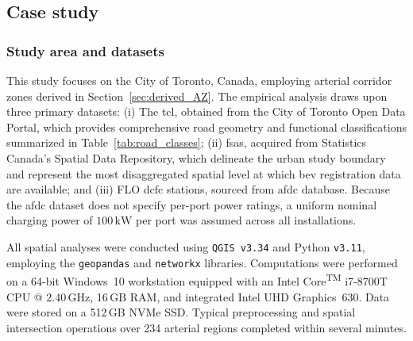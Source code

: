  

\subsection{Case study}
\label{sec:case_study}
\subsubsection{Study area and datasets}
\label{subsec:study_area}
This study focuses on the City of Toronto, Canada, employing arterial corridor zones derived in Section~\ref{sec:derived_AZ}. 
The empirical analysis draws upon three primary datasets: 
(i) The \gls{tcl}, obtained from the City of Toronto Open Data Portal, which provides comprehensive road geometry and functional classifications summarized in Table~\ref{tab:road_classes}; 
(ii) \glspl{fsa}, acquired from Statistics Canada’s Spatial Data Repository, which delineate the urban study boundary and represent the most disaggregated spatial level at which \gls{bev} registration data are available; and 
(iii) FLO \gls{dcfc} stations, sourced from \gls{afdc} database. 
Because the \gls{afdc} dataset does not specify per-port power ratings, a uniform nominal charging power of $100\,\mathrm{kW}$ per port was assumed across all installations. 

All spatial analyses were conducted using \texttt{QGIS v3.34} and Python \texttt{v3.11}, employing the \texttt{geopandas} and \texttt{networkx} libraries. 
Computations were performed on a 64-bit Windows~10 workstation equipped with an Intel\textsuperscript{\textregistered} Core\textsuperscript{TM} i7-8700T CPU @ 2.40\,GHz, 16\,GB RAM, and integrated Intel UHD Graphics~630. 
Data were stored on a 512\,GB NVMe SSD. 
Typical preprocessing and spatial intersection operations over 234 arterial regions completed within several minutes.
